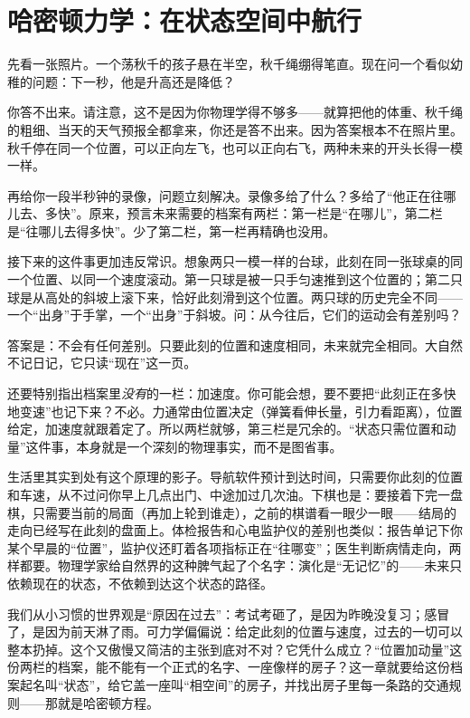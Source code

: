 \chapter{哈密顿力学：在状态空间中航行}


\begin{mainline}
先看一张照片。一个荡秋千的孩子悬在半空，秋千绳绷得笔直。现在问一个看似幼稚的问题：下一秒，他是升高还是降低？

你答不出来。请注意，这不是因为你物理学得不够多——就算把他的体重、秋千绳的粗细、当天的天气预报全都拿来，你还是答不出来。因为答案根本不在照片里。秋千停在同一个位置，可以正向左飞，也可以正向右飞，两种未来的开头长得一模一样。

再给你一段半秒钟的录像，问题立刻解决。录像多给了什么？多给了“他正在往哪儿去、多快”。原来，预言未来需要的档案有两栏：第一栏是“在哪儿”，第二栏是“往哪儿去得多快”。少了第二栏，第一栏再精确也没用。

接下来的这件事更加违反常识。想象两只一模一样的台球，此刻在同一张球桌的同一个位置、以同一个速度滚动。第一只球是被一只手匀速推到这个位置的；第二只球是从高处的斜坡上滚下来，恰好此刻滑到这个位置。两只球的历史完全不同——一个“出身”于手掌，一个“出身”于斜坡。问：从今往后，它们的运动会有差别吗？

答案是：不会有任何差别。只要此刻的位置和速度相同，未来就完全相同。大自然不记日记，它只读“现在”这一页。

还要特别指出档案里\emph{没有}的一栏：加速度。你可能会想，要不要把“此刻正在多快地变速”也记下来？不必。力通常由位置决定（弹簧看伸长量，引力看距离），位置给定，加速度就跟着定了。所以两栏就够，第三栏是冗余的。“状态只需位置和动量”这件事，本身就是一个深刻的物理事实，而不是图省事。

生活里其实到处有这个原理的影子。导航软件预计到达时间，只需要你此刻的位置和车速，从不过问你早上几点出门、中途加过几次油。下棋也是：要接着下完一盘棋，只需要当前的局面（再加上轮到谁走），之前的棋谱看一眼少一眼——结局的走向已经写在此刻的盘面上。体检报告和心电监护仪的差别也类似：报告单记下你某个早晨的“位置”，监护仪还盯着各项指标正在“往哪变”；医生判断病情走向，两样都要。物理学家给自然界的这种脾气起了个名字：演化是“无记忆”的——未来只依赖现在的状态，不依赖到达这个状态的路径。

我们从小习惯的世界观是“原因在过去”：考试考砸了，是因为昨晚没复习；感冒了，是因为前天淋了雨。可力学偏偏说：给定此刻的位置与速度，过去的一切可以整本扔掉。这个又傲慢又简洁的主张到底对不对？它凭什么成立？“位置加动量”这份两栏的档案，能不能有一个正式的名字、一座像样的房子？这一章就要给这份档案起名叫“状态”，给它盖一座叫“相空间”的房子，并找出房子里每一条路的交通规则——那就是哈密顿方程。
\end{mainline}

